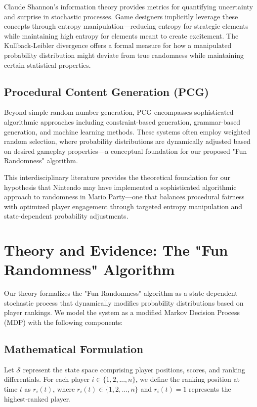 \documentclass{article}
\begin{document}
Claude Shannon's information theory provides metrics for quantifying uncertainty and surprise in stochastic processes. Game designers implicitly leverage these concepts through entropy manipulation—reducing entropy for strategic elements while maintaining high entropy for elements meant to create excitement. The Kullback-Leibler divergence offers a formal measure for how a manipulated probability distribution might deviate from true randomness while maintaining certain statistical properties.

\subsection{Procedural Content Generation (PCG)}

Beyond simple random number generation, PCG encompasses sophisticated algorithmic approaches including constraint-based generation, grammar-based generation, and machine learning methods. These systems often employ weighted random selection, where probability distributions are dynamically adjusted based on desired gameplay properties—a conceptual foundation for our proposed "Fun Randomness" algorithm.

This interdisciplinary literature provides the theoretical foundation for our hypothesis that Nintendo may have implemented a sophisticated algorithmic approach to randomness in Mario Party—one that balances procedural fairness with optimized player engagement through targeted entropy manipulation and state-dependent probability adjustments.

\section{Theory and Evidence: The "Fun Randomness" Algorithm}

Our theory formalizes the "Fun Randomness" algorithm as a state-dependent stochastic process that dynamically modifies probability distributions based on player rankings. We model the system as a modified Markov Decision Process (MDP) with the following components:

\subsection{Mathematical Formulation}

Let $\mathcal{S}$ represent the state space comprising player positions, scores, and ranking differentials. For each player $i \in \{1,2,...,n\}$, we define the ranking position at time $t$ as $r_i(t)$, where $r_i(t) \in \{1,2,...,n\}$ and $r_i(t) = 1$ represents the highest-ranked player.
\end{document}
